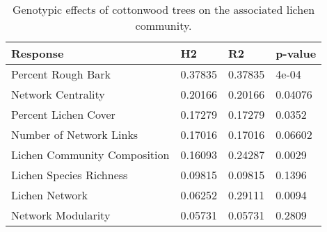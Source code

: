 \begin{table}[ht]
\centering
\begin{tabular}{llll}
  \hline
Response & H2 & R2 & p-value \\ 
  \hline
Percent Rough Bark & 0.37835 & 0.37835 & 4e-04 \\ 
  Network Centrality & 0.20166 & 0.20166 & 0.04076 \\ 
  Percent Lichen Cover & 0.17279 & 0.17279 & 0.0352 \\ 
  Number of Network Links & 0.17016 & 0.17016 & 0.06602 \\ 
  Lichen Community Composition & 0.16093 & 0.24287 & 0.0029 \\ 
  Lichen Species Richness & 0.09815 & 0.09815 & 0.1396 \\ 
  Lichen Network & 0.06252 & 0.29111 & 0.0094 \\ 
  Network Modularity & 0.05731 & 0.05731 & 0.2809 \\ 
   \hline
\end{tabular}
\caption{Genotypic effects of cottonwood trees on the associated lichen community.} 
\label{tab:h2_table}
\end{table}
